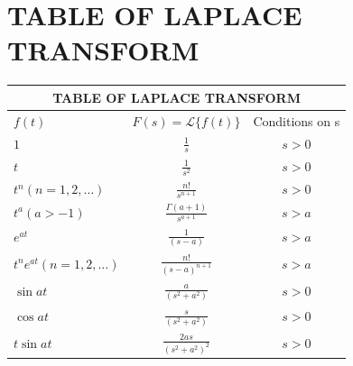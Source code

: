 \documentclass[12pt]{report}
\begin{document}
\section{TABLE OF LAPLACE TRANSFORM}
\begin{center}
	\renewcommand{\arraystretch}{1.7}
	\renewcommand{\tabcolsep}{9mm}
	\begin{tabular}{llcccc}
		\multicolumn{6}{c}{TABLE OF LAPLACE TRANSFORM} \\
		\hline 
		\multicolumn{2}{l}{$f(t)$} &  \multicolumn{2}{c}{$F(s) = \mathcal{L}\{f(t)\}$} & \multicolumn{2}{c}{Conditions on s} \\ 
		\hline
		
 		\multicolumn{2}{l}{$\displaystyle1$} & \multicolumn{2}{c}{$\displaystyle \frac{1}{s}$} & \multicolumn{2}{c}{$s > 0$} \\
		
		\multicolumn{2}{l}{$\displaystyle t$} & \multicolumn{2}{c}{$\displaystyle \frac{1}{s^2}$} & \multicolumn{2}{c}{$s > 0$} \\

		\multicolumn{2}{l}{$\displaystyle t^n (n=1,2,\ldots)$} & \multicolumn{2}{c}{$\displaystyle \frac{n!}{s^{n+1}}$} & \multicolumn{2}{c}{$s > 0$} \\


		\multicolumn{2}{l}{$\displaystyle t^a (a > -1)$} & \multicolumn{2}{c}{$\displaystyle \frac{\Gamma(a+1)}{s^{a+1}}$} & \multicolumn{2}{c}{$s > a$} \\



		\multicolumn{2}{l}{$\displaystyle e^{at}$} & \multicolumn{2}{c}{$\displaystyle \frac{1}{(s-a)}$} & \multicolumn{2}{c}{$s > a$} \\

		\multicolumn{2}{l}{$\displaystyle t^n e^{at} (n= 1, 2,\ldots)$} & \multicolumn{2}{c}{$\displaystyle \frac{n!}{(s-a)^{n+1}}$} & \multicolumn{2}{c}{$s > a$} \\


		\multicolumn{2}{l}{$\displaystyle \sin at$} & \multicolumn{2}{c}{$\displaystyle \frac{a}{(s^2 + a^2)}$} & \multicolumn{2}{c}{$s > 0$} \\

		\multicolumn{2}{l}{$\displaystyle \cos at$} & \multicolumn{2}{c}{$\displaystyle \frac{s}{(s^2 + a^2)}$} & \multicolumn{2}{c}{$s > 0$} \\


		\multicolumn{2}{l}{$\displaystyle t \sin at$} & \multicolumn{2}{c}{$\displaystyle \frac{2as}{(s^2 + a^2)^2}$} & \multicolumn{2}{c}{$s > 0$} \\


\end{tabular}
\end{center}
\end{document}
